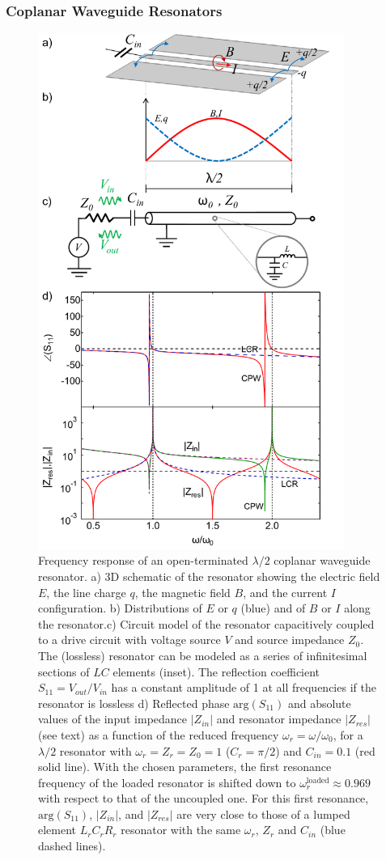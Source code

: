 \subsubsection{Coplanar Waveguide Resonators}

\begin{figure}
	\includegraphics[width=10cm]{"./material/mathematica/lcr_and_cpw_schematic_with_plots"}
	\caption{Frequency response of an open-terminated $\lambda/2$ coplanar waveguide resonator.  a) 3D schematic of the resonator showing the electric field $E$, the line charge $q$, the magnetic field $B$, and the current $I$ configuration. b) Distributions of $E$ or $q$ (blue) and of $B$ or $I$ along the resonator.c) Circuit model of the resonator capacitively coupled to a drive circuit with voltage source $V$ and source impedance $Z_0$. The (lossless) resonator can be modeled as a series of infinitesimal sections of $LC$ elements (inset). The reflection coefficient $S_{11}=V_{out}/V_{in}$ has a constant amplitude of 1 at all frequencies if the resonator is lossless  d) Reflected phase $\mathrm{arg}(S_{11})$ and absolute values of the input impedance $|Z_{in}|$ and resonator impedance $|Z_{res}|$ (see text) as a function  of the reduced frequency $\omega_r=\omega/\omega_0$, for a $\lambda/2$ resonator with $\omega_r=Z_r=Z_0=1$ ($C_r=\pi/2$) and $C_{in}=0.1$ (red solid line). With the chosen parameters, the first resonance frequency of the loaded resonator is shifted down to  $\omega_{r}^\mathrm{loaded}\approx 0.969$  with respect to that of the uncoupled one. For this first resonance,  $\mathrm{arg}(S_{11})$, $|Z_{in}|$, and $|Z_{res}|$ are very close to those of a lumped element $L_rC_rR_r$ resonator with the same $\omega_r$, $Z_r$ and $C_{in}$  (blue dashed lines).}

\end{figure}
